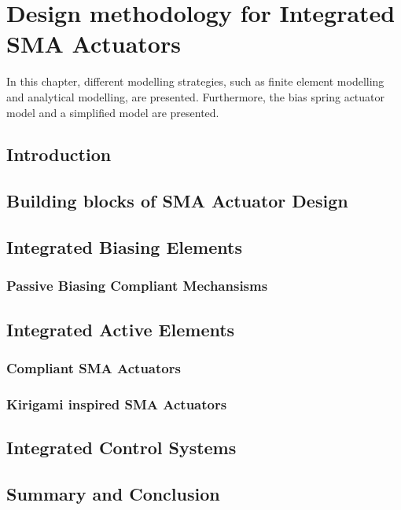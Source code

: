 
\chapter{Design methodology for Integrated SMA Actuators}
In this chapter, different modelling strategies, such as finite element modelling and analytical modelling, are presented. Furthermore, the bias spring actuator model and a simplified model are presented.
\section{Introduction}
\section{Building blocks of SMA Actuator Design}

\section{Integrated Biasing Elements}
\subsection{Passive Biasing Compliant Mechansisms}

\section{Integrated Active Elements}
\subsection{Compliant SMA Actuators}
\subsection{Kirigami inspired SMA Actuators}

\section{Integrated Control Systems}
\section{Summary and Conclusion}
